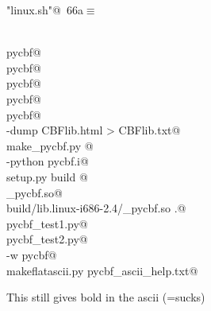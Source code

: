 \documentclass[10pt,a4paper,twoside,notitlepage]{article}
\begin{document}
\begin{flushleft} \small
\begin{minipage}{\linewidth}\label{scrap11}\raggedright\small
{} \verb@"linux.sh"@\nobreak\ {\footnotesize {66a}}$\equiv$
\vspace{-1ex}
\begin{list}{}{} \item
\mbox{}\verb@@\\
\mbox{}\verb@nuweb pycbf@\\
\mbox{}\verb@pdflatex pycbf@\\
\mbox{}\verb@pdflatex pycbf@\\
\mbox{}\verb@nuweb pycbf@\\
\mbox{}\verb@pdflatex pycbf@\\
\mbox{}\verb@lynx -dump CBFlib.html > CBFlib.txt@\\
\mbox{}\verb@python make_pycbf.py @\\
\mbox{}\verb@swig -python pycbf.i@\\
\mbox{}\verb@python setup.py build @\\
\mbox{}\verb@rm _pycbf.so@\\
\mbox{}\verb@cp build/lib.linux-i686-2.4/_pycbf.so .@\\
\mbox{}\verb@python pycbf_test1.py@\\
\mbox{}\verb@python pycbf_test2.py@\\
\mbox{}\verb@pydoc -w pycbf@\\
\mbox{}\verb@python makeflatascii.py pycbf_ascii_help.txt@\\
\mbox{}\verb@@{\NWsep}
\end{list}
\vspace{-1.5ex}
\footnotesize
\begin{list}{}{\setlength{\itemsep}{-\parsep}\setlength{\itemindent}{-\leftmargin}}

\item{}
\end{list}
\end{minipage}\vspace{4ex}
\end{flushleft}
This still gives bold in the ascii (=sucks)
\end{document}
